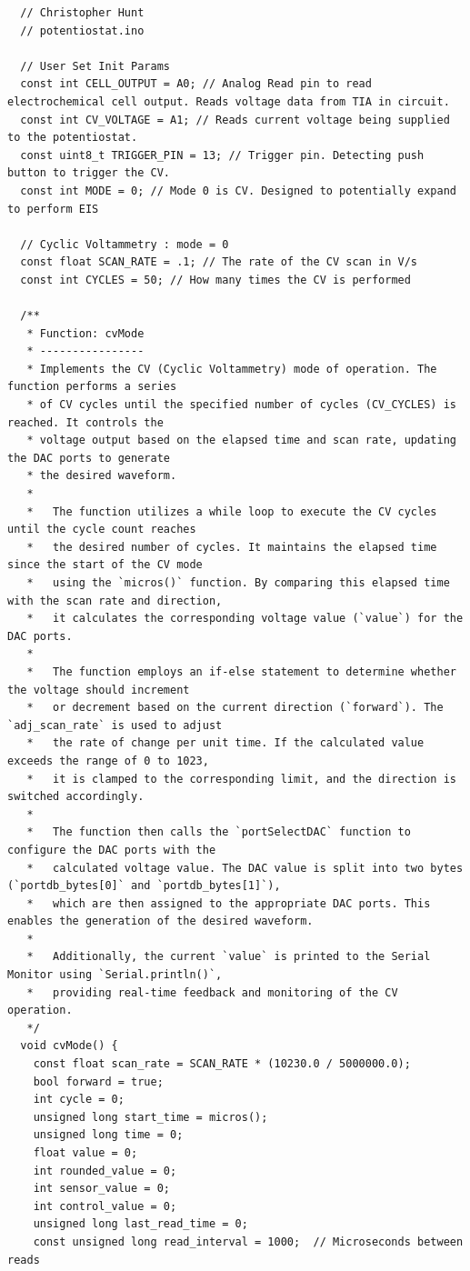 \documentclass{article}
\begin{document}
\begin{lstlisting}
  // Christopher Hunt
  // potentiostat.ino

  // User Set Init Params
  const int CELL_OUTPUT = A0; // Analog Read pin to read electrochemical cell output. Reads voltage data from TIA in circuit.
  const int CV_VOLTAGE = A1; // Reads current voltage being supplied to the potentiostat.
  const uint8_t TRIGGER_PIN = 13; // Trigger pin. Detecting push button to trigger the CV.
  const int MODE = 0; // Mode 0 is CV. Designed to potentially expand to perform EIS
  
  // Cyclic Voltammetry : mode = 0
  const float SCAN_RATE = .1; // The rate of the CV scan in V/s
  const int CYCLES = 50; // How many times the CV is performed
  
  /**
   * Function: cvMode
   * ----------------
   * Implements the CV (Cyclic Voltammetry) mode of operation. The function performs a series
   * of CV cycles until the specified number of cycles (CV_CYCLES) is reached. It controls the
   * voltage output based on the elapsed time and scan rate, updating the DAC ports to generate
   * the desired waveform.
   *
   *   The function utilizes a while loop to execute the CV cycles until the cycle count reaches
   *   the desired number of cycles. It maintains the elapsed time since the start of the CV mode
   *   using the `micros()` function. By comparing this elapsed time with the scan rate and direction,
   *   it calculates the corresponding voltage value (`value`) for the DAC ports.
   *
   *   The function employs an if-else statement to determine whether the voltage should increment
   *   or decrement based on the current direction (`forward`). The `adj_scan_rate` is used to adjust
   *   the rate of change per unit time. If the calculated value exceeds the range of 0 to 1023,
   *   it is clamped to the corresponding limit, and the direction is switched accordingly.
   *
   *   The function then calls the `portSelectDAC` function to configure the DAC ports with the
   *   calculated voltage value. The DAC value is split into two bytes (`portdb_bytes[0]` and `portdb_bytes[1]`),
   *   which are then assigned to the appropriate DAC ports. This enables the generation of the desired waveform.
   *
   *   Additionally, the current `value` is printed to the Serial Monitor using `Serial.println()`,
   *   providing real-time feedback and monitoring of the CV operation.
   */
  void cvMode() {
    const float scan_rate = SCAN_RATE * (10230.0 / 5000000.0);
    bool forward = true;
    int cycle = 0;
    unsigned long start_time = micros();
    unsigned long time = 0;
    float value = 0;
    int rounded_value = 0;
    int sensor_value = 0;
    int control_value = 0;
    unsigned long last_read_time = 0;
    const unsigned long read_interval = 1000;  // Microseconds between reads
  

\end{lstlisting}
\end{document}

